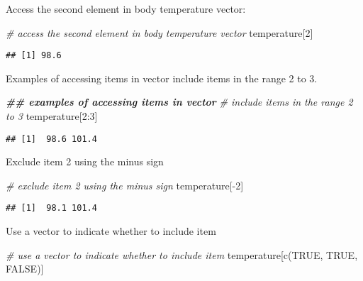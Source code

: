 \documentclass[
]{article}
\newenvironment{Shaded}{\begin{snugshade}}{\end{snugshade}}
\newcommand{\CommentTok}[1]{\textcolor[rgb]{0.56,0.35,0.01}{\textit{#1}}}
\newcommand{\ConstantTok}[1]{\textcolor[rgb]{0.00,0.00,0.00}{#1}}
\newcommand{\DecValTok}[1]{\textcolor[rgb]{0.00,0.00,0.81}{#1}}
\newcommand{\DocumentationTok}[1]{\textcolor[rgb]{0.56,0.35,0.01}{\textbf{\textit{#1}}}}
\newcommand{\FunctionTok}[1]{\textcolor[rgb]{0.00,0.00,0.00}{#1}}
\newcommand{\NormalTok}[1]{#1}
\newcommand{\SpecialCharTok}[1]{\textcolor[rgb]{0.00,0.00,0.00}{#1}}
\begin{document}
Access the second element in body temperature vector:

\begin{Shaded}
\begin{Highlighting}[]
\CommentTok{\# access the second element in body temperature vector}
\NormalTok{temperature[}\DecValTok{2}\NormalTok{]}
\end{Highlighting}
\end{Shaded}

\begin{verbatim}
## [1] 98.6
\end{verbatim}

Examples of accessing items in vector include items in the range 2 to 3.

\begin{Shaded}
\begin{Highlighting}[]
\DocumentationTok{\#\# examples of accessing items in vector}
\CommentTok{\# include items in the range 2 to 3}
\NormalTok{temperature[}\DecValTok{2}\SpecialCharTok{:}\DecValTok{3}\NormalTok{]}
\end{Highlighting}
\end{Shaded}

\begin{verbatim}
## [1]  98.6 101.4
\end{verbatim}

Exclude item 2 using the minus sign

\begin{Shaded}
\begin{Highlighting}[]
\CommentTok{\# exclude item 2 using the minus sign}
\NormalTok{temperature[}\SpecialCharTok{{-}}\DecValTok{2}\NormalTok{]}
\end{Highlighting}
\end{Shaded}

\begin{verbatim}
## [1]  98.1 101.4
\end{verbatim}

Use a vector to indicate whether to include item

\begin{Shaded}
\begin{Highlighting}[]
\CommentTok{\# use a vector to indicate whether to include item}
\NormalTok{temperature[}\FunctionTok{c}\NormalTok{(}\ConstantTok{TRUE}\NormalTok{, }\ConstantTok{TRUE}\NormalTok{, }\ConstantTok{FALSE}\NormalTok{)]}
\end{Highlighting}
\end{Shaded}
\end{document}
